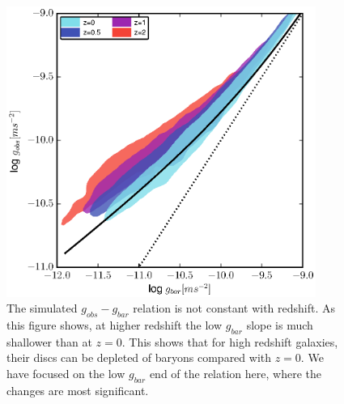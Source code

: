 \begin{figure}
    \includegraphics[width=0.9\textwidth]{figures4/redshift_evolution.eps}
    \caption{The  simulated $g_{obs}-g_{bar}$ relation is not constant with
    redshift.  As this figure shows, at higher redshift the low $g_{bar}$ slope
    is much shallower than at $z=0$.  This shows that for high redshift
    galaxies, their discs can be depleted of baryons compared with $z=0$.  We
    have focused on the low $g_{bar}$ end of the relation here, where the
    changes are most significant.}
    \label{redshift_evolution}
\end{figure}
